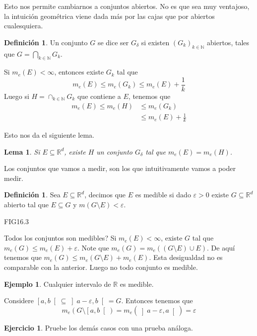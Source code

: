 \documentclass[12pt]{article}
\theoremstyle{plain}
\newtheorem{Lem}[Th]{Lema}             %
\theoremstyle{definition}
\newtheorem{Def}[Th]{Definición}       %
\newtheorem{Ex}[Th]{Ejemplo}               %
\newtheorem{Ej}[Th]{Ejercicio}
\theoremstyle{remark}
\numberwithin{equation}{section}
\newcommand{\bN}{\mathbb{N}}        %
\newcommand{\bR}{\mathbb{R}}        %
\renewcommand{\leq}{\leqslant}      %
\renewcommand{\:}{\colon}           %
\newcommand{\obonj}[1]{\left\rbrack#1\right\lbrack}
\newcommand{\lbonj}[1]{\left\lbrack#1\right\lbrack}
\begin{document}
\begin{multicols}{2}
Esto nos permite cambiarnos a conjuntos abiertos. No es que sea muy ventajoso, la intuición geométrica viene dada más por las cajas que por abiertos cualesquiera.

\begin{Def}
  Un conjunto $G$ se dice ser $G_\delta$ si existen $(G_k)_{k\in\bN}$ abiertos, tales que $G=\bigcap_{k\in\bN}G_k$.
\end{Def}

Si $m_e(E)<\infty$, entonces existe $G_k$ tal que
$$m_e(E)\leq m_e(G_k)\leq m_e(E)+\frac{1}{k}$$
Luego si $H=\cap_{k\in\bN}G_k$ que contiene a $E$, tenemos que
\begin{align*}
  m_e(E)\leq m_e(H) &\leq m_e(G_k)\\
  &\leq m_e(E)+\frac{1}{k}
\end{align*}

Esto nos da el siguiente lema.

\begin{Lem}
  Si $E\subseteq\bR^d$, existe $H$ un conjunto $G_\delta$ tal que $m_e(E)=m_e(H)$.
\end{Lem}

Los conjuntos que vamos a medir, son los que intuitivamente vamos a poder medir.

\begin{Def}
  Sea $E\subseteq\bR^d$, decimos que $E$ es medible si dado $\varepsilon>0$ existe $G\subseteq\bR^d$ abierto tal que $E\subseteq G$ y $m(G\setminus E)<\varepsilon$.
\end{Def}

FIG16.3\par
Todos los conjuntos son medibles? Si $m_e(E)<\infty$, existe $G$ tal que $m_e(G)\leq m_e(E)+\varepsilon$. Note que $m_e(G)=m_e((G\setminus E)\cup E)$. De aquí tenemos que
$m_e(G)\leq m_e(G\setminus E)+m_e(E)$. Esta desigualdad no es comparable con la anterior. Luego no todo conjunto es medible.

\begin{Ex}
  Cualquier intervalo de $\bR$ es medible.
\end{Ex}

\begin{ptcb}
Considere $\lbonj{a,b}\subseteq\obonj{a-\varepsilon,b}=G$. Entonces tenemos que
$$m_e(G\setminus\lbonj{a,b})=m_e(\obonj{a-\varepsilon,a})=\varepsilon$$
\end{ptcb}

\begin{Ej}
  Pruebe los demás casos con una prueba análoga.
\end{Ej}


\end{multicols}
\end{document}
